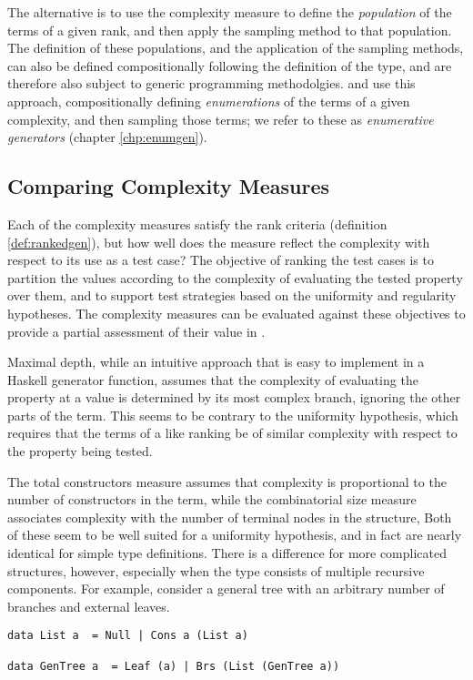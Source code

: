 The alternative is to use the complexity measure to define the \emph{population} of the terms of a given rank,
and then apply the sampling method to that population.
The definition of these populations,
and the application of the sampling methods,
can also be defined compositionally following the definition of the type,
and are therefore also subject to generic programming methodolgies.
\GC and \FEAT use this approach,
compositionally defining \emph{enumerations} of the terms of a given complexity,
and then sampling those terms;
we refer to these as \emph{enumerative generators}
(chapter \ref{chp:enumgen}).

\subsection{Comparing Complexity Measures}\label{sub:cmprcomplex}

Each of the complexity measures satisfy the rank criteria (definition \ref{def:rankedgen}),
but how well does the measure reflect the complexity with respect to its use as a test case?
The objective of ranking the test cases is to partition the values
according to the complexity of evaluating the tested property over them,
and to support test strategies based on the uniformity and regularity hypotheses.
The complexity measures can be evaluated against these objectives
to provide a partial assessment of their value in \pbt.

Maximal depth, while an intuitive approach that is easy to implement in a Haskell generator function, 
assumes that the complexity of evaluating the property at a value is 
determined by its most complex branch,
ignoring the other parts of the term.
This seems to be contrary to the uniformity hypothesis,
which requires that the terms of a like ranking be of similar complexity with respect to the property being tested.

The total constructors measure assumes that complexity is proportional to the number of constructors in the term,
while the combinatorial size measure associates complexity with the number of terminal nodes in the structure,
Both of these seem to be well suited for a uniformity hypothesis,
and in fact are nearly identical for simple type definitions.
There is a difference for more complicated structures, however,
especially when the type consists of multiple recursive components.
For example, consider a general tree with an arbitrary number of branches and external leaves.

\begin{lstlisting}
data List a  = Null | Cons a (List a)

data GenTree a  = Leaf (a) | Brs (List (GenTree a))
\end{lstlisting}

